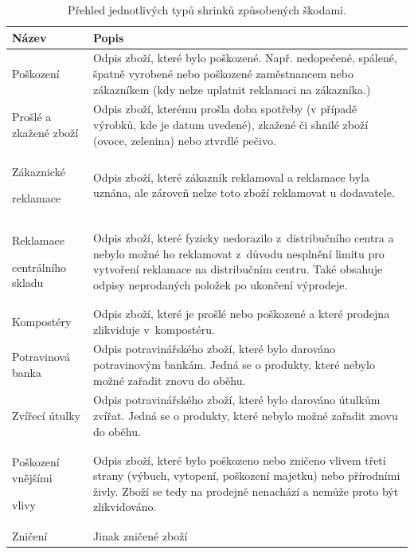 \begin{table}[hbtp!]
    \caption{Přehled jednotlivých typů shrinků způsobených škodami.}
    \label{tab:sh:dam}
    \begin{tabular}{ p{4cm} p{10.5cm}}
         Název             & Popis \\
    \hline
                Poškození               & Odpis zboží, které bylo poškozené. Např. nedopečené, spálené, špatně vyrobené nebo poškozené zaměstnancem nebo zákazníkem (kdy nelze uplatnit reklamaci na zákazníka.)       \\
                Prošlé a zkažené zboží  & Odpis zboží, kterému prošla doba spotřeby (v případě výrobků, kde je datum uvedené), zkažené či shnilé zboží (ovoce, zelenina) nebo ztvrdlé pečivo.       \\
                Zákaznické \par reklamace \strut  & Odpis zboží, které zákazník reklamoval a reklamace byla uznána, ale zároveň nelze toto zboží reklamovat u dodavatele.      \\
                Reklamace \par centrálního skladu \strut   &  Odpis zboží, které fyzicky nedorazilo z~distribučního centra a nebylo možné ho reklamovat z~důvodu nesplnění limitu pro vytvoření reklamace na distribučním centru. Také obsahuje odpisy neprodaných položek po ukončení výprodeje.     \\
                Kompostéry              & Odpis zboží, které je prošlé nebo poškozené a které prodejna zlikviduje v~kompostéru.       \\
                Potravinová banka       & Odpis potravinářského zboží, které bylo darováno potravinovým bankám. Jedná se o produkty, které nebylo možné zařadit znovu do oběhu.    \\
                Zvířecí útulky          & Odpis potravinářského zboží, které bylo darováno útulkům zvířat. Jedná se o produkty, které nebylo možné zařadit znovu do oběhu.          \\
                Poškození vnějšími \par vlivy \strut %
                                        & Odpis zboží, které bylo poškozeno nebo zničeno vlivem třetí strany (výbuch, vytopení, poškození majetku) nebo přírodními živly. Zboží se tedy na prodejně nenachází a nemůže proto být zlikvidováno.      \\
                Zničení & Jinak zničené zboží \\
    \end{tabular}
\end{table}



\vspace*{1em}